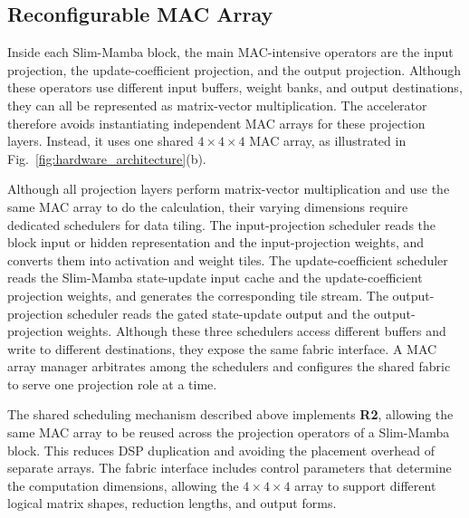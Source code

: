 \documentclass[lettersize,journal]{IEEEtran}
\begin{document}
\subsection{Reconfigurable MAC Array}

Inside each Slim-Mamba block, the main MAC-intensive operators are the input
projection, the update-coefficient projection, and the output
projection. Although these operators use different input buffers, weight banks,
and output destinations, they can all be represented as matrix-vector
multiplication. The accelerator therefore avoids instantiating independent MAC arrays for
these projection layers. Instead, it uses
one shared $4\times4\times4$ MAC array, as illustrated in
Fig.~\ref{fig:hardware_architecture}(b).

Although all projection layers perform matrix-vector multiplication and use the same MAC array to do the calculation, their varying dimensions require dedicated schedulers for data tiling. The
input-projection scheduler reads the block input or hidden representation and
the input-projection weights, and converts them into activation and weight tiles.
The update-coefficient scheduler reads the Slim-Mamba state-update input cache and the update-coefficient
projection weights, and generates the corresponding tile stream. The
output-projection scheduler reads the gated state-update output and the output-projection
weights. Although these three schedulers access different buffers and write to
different destinations, they expose the same fabric interface. A MAC array
manager arbitrates among the schedulers and configures the shared fabric to
serve one projection role at a time.

The shared scheduling mechanism described above implements \textbf{R2}, allowing the same MAC array to be reused across the projection operators of a Slim-Mamba block. This reduces DSP duplication and avoiding the placement overhead of separate arrays.  The fabric interface includes control parameters that determine the computation dimensions, allowing the $4\times4\times4$ array to support
different logical matrix shapes, reduction lengths, and output forms. 
\end{document}
